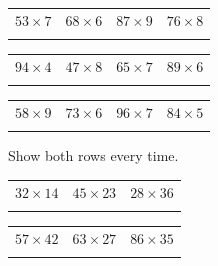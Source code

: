 \documentclass[12pt,a4paper]{article}
\begin{document}

\vspace{2pt}
\noindent
\begin{tabularx}{\textwidth}{|X|X|X|X|}
  \hline
  $53 \times 7$ & $68 \times 6$ & $87 \times 9$ & $76 \times 8$ \\
  \rule[-2.6em]{0pt}{3.2em} & & & \\
  \hline
\end{tabularx}

\vspace{9pt}
\noindent
\begin{tabularx}{\textwidth}{|X|X|X|X|}
  \hline
  $94 \times 4$ & $47 \times 8$ & $65 \times 7$ & $89 \times 6$ \\
  \rule[-2.6em]{0pt}{3.2em} & & & \\
  \hline
\end{tabularx}

\vspace{9pt}
\noindent
\begin{tabularx}{\textwidth}{|X|X|X|X|}
  \hline
  $58 \times 9$ & $73 \times 6$ & $96 \times 7$ & $84 \times 5$ \\
  \rule[-2.6em]{0pt}{3.2em} & & & \\
  \hline
\end{tabularx}


\noindent {} Show both rows every time.

\vspace{4pt}
\noindent
\begin{tabularx}{\textwidth}{|X|X|X|}
  \hline
  $32 \times 14$ & $45 \times 23$ & $28 \times 36$ \\
  \rule[-3.3em]{0pt}{4.1em} & & \\
  \hline
\end{tabularx}

\vspace{9pt}
\noindent
\begin{tabularx}{\textwidth}{|X|X|X|}
  \hline
  $57 \times 42$ & $63 \times 27$ & $86 \times 35$ \\
  \rule[-3.3em]{0pt}{4.1em} & & \\
  \hline
\end{tabularx}
\end{document}
